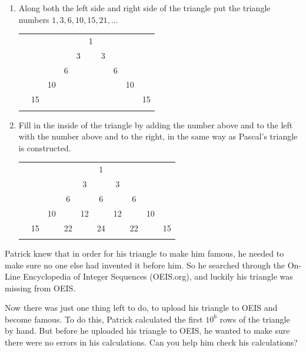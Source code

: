 \begin{enumerate}

\item{Along both the left side and right side of the triangle put the triangle numbers $1,3,6,10,15,21,\ldots$}


\begin{center}
\begin{tabular}{rccccccccc}
&    &    &    &    &  1\\\noalign{\smallskip\smallskip}
&    &    &    &  3 &    &  3\\\noalign{\smallskip\smallskip}
&    &    &  6 &    &   &    &  6\\\noalign{\smallskip\smallskip}
&    &  10 &    &   &    &   &    &  10\\\noalign{\smallskip\smallskip}
&  15 &    &   &    &   &    &   &    &  15\\\noalign{\smallskip\smallskip}
\end{tabular}
\end{center}

\item{Fill in the inside of the triangle by adding the number above and to the left with the number above and to the right, in the same way as Pascal's triangle is constructed.}

\begin{center}
\begin{tabular}{rccccccccc}
&     &     &    &    &  1\\\noalign{\smallskip\smallskip}
&     &     &    &  3 &    &  3\\\noalign{\smallskip\smallskip}
&     &     &  6 &    & 6  &    &  6\\\noalign{\smallskip\smallskip}
&     &  10 &    & 12  &    & 12  &    &  10\\\noalign{\smallskip\smallskip}
&  15 &     & 22  &    &  24  &    &  22  &    &  15\\\noalign{\smallskip\smallskip}
\end{tabular}
\end{center}

\end{enumerate}

Patrick knew that in order for his triangle to make him famous, he needed to make sure no one else had invented it before him. So he searched through the On-Line Encyclopedia of Integer Sequences (OEIS.org), and luckily his triangle was missing from OEIS. 

Now there was just one thing left to do, to upload his triangle to OEIS and become famous. To do this, Patrick calculated the first $10^6$ rows of the triangle by hand. But before he uploaded his triangle to OEIS, he wanted to make sure there were no errors in his calculations. Can you help him check his calculations?


